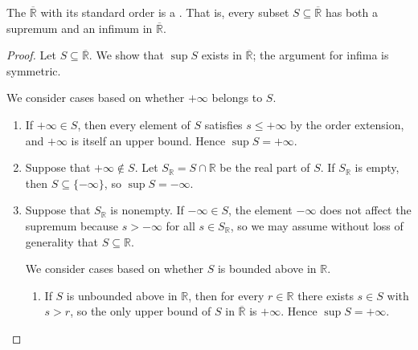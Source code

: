 \begin{proposition} \label{proposition:the_extended_real_line_is_a_complete_lattice}
The  $\overline{\mathbb{R}}$ with its standard order is a . That is, every subset $S \subseteq \overline{\mathbb{R}}$ has both a supremum and an infimum in $\overline{\mathbb{R}}$.
\end{proposition}
\begin{proof}
    Let $S \subseteq \overline{\mathbb{R}}$. We show that $\sup S$ exists in $\overline{\mathbb{R}}$; the argument for infima is symmetric.

    We consider cases based on whether $+\infty$ belongs to $S$.
    \begin{enumerate}
        \item If $+\infty \in S$, then every element of $S$ satisfies $s \leq +\infty$ by the order extension, and $+\infty$ is itself an upper bound. Hence $\sup S = +\infty$.

        \item Suppose that $+\infty \notin S$. Let $S_{\mathbb{R}} = S \cap \mathbb{R}$ be the real part of $S$. If $S_{\mathbb{R}}$ is empty, then $S \subseteq \{-\infty\}$, so $\sup S = -\infty$.

        \item Suppose that $S_{\mathbb{R}}$ is nonempty. If $-\infty \in S$, the element $-\infty$ does not affect the supremum because $s > -\infty$ for all $s \in S_{\mathbb{R}}$, so we may assume without loss of generality that $S \subseteq \mathbb{R}$.

        We consider cases based on whether $S$ is bounded above in $\mathbb{R}$.
        \begin{enumerate}
            \item If $S$ is unbounded above in $\mathbb{R}$, then for every $r \in \mathbb{R}$ there exists $s \in S$ with $s > r$, so the only upper bound of $S$ in $\overline{\mathbb{R}}$ is $+\infty$. Hence $\sup S = +\infty$.


\end{enumerate}
\end{enumerate}
\end{proof}
